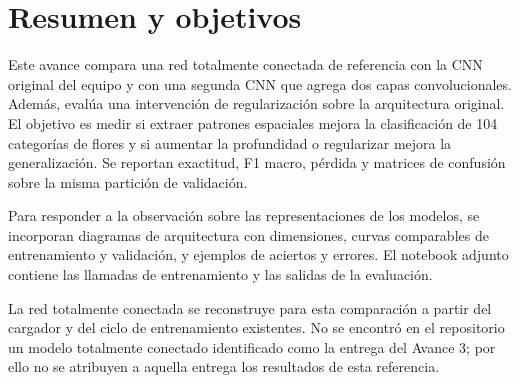 \section{Resumen y objetivos}

Este avance compara una red totalmente conectada de referencia con la CNN
original del equipo y con una segunda CNN que agrega dos capas convolucionales.
Además, evalúa una intervención de regularización sobre la arquitectura original.
El objetivo es medir si extraer patrones espaciales mejora la clasificación de
104 categorías de flores y si aumentar la profundidad o regularizar mejora la
generalización. Se reportan exactitud, F1 macro, pérdida y matrices de confusión
sobre la misma partición de validación.

Para responder a la observación sobre las representaciones de los modelos,
se incorporan diagramas de arquitectura con dimensiones, curvas comparables de
entrenamiento y validación, y ejemplos de aciertos y errores. El notebook adjunto
contiene las llamadas de entrenamiento y las salidas de la evaluación.

La red totalmente conectada se reconstruye para esta comparación a partir del
cargador y del ciclo de entrenamiento existentes. No se encontró en el repositorio
un modelo totalmente conectado identificado como la entrega del Avance 3; por
ello no se atribuyen a aquella entrega los resultados de esta referencia.
